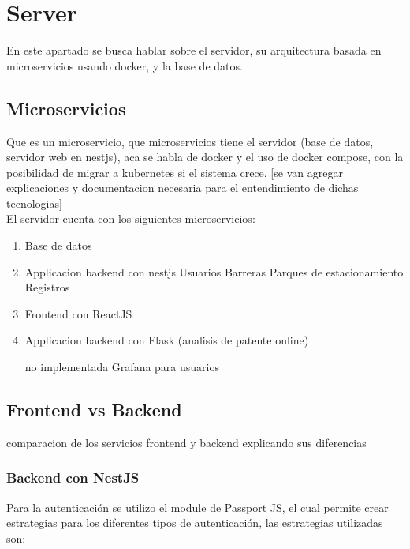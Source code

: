 \section{Server}

En este apartado se busca hablar sobre el servidor, su arquitectura basada en microservicios usando docker, y la base de datos.

\subsection{Microservicios}


Que es un microservicio, que microservicios tiene el servidor (base de datos, servidor web en nestjs), aca se habla de docker y el uso de docker compose, con la posibilidad de migrar a kubernetes si el sistema crece. [se van agregar explicaciones y documentacion necesaria para el
                entendimiento de dichas tecnologias] \\

El servidor cuenta con los siguientes microservicios:

\begin{enumerate}
        \item Base de datos
        \item Applicacion backend con nestjs
              \subitem Usuarios
              \subitem Barreras
              \subitem Parques de estacionamiento
              \subitem Registros
        \item Frontend con ReactJS
        \item Applicacion backend con Flask (analisis de patente online)
        \item [no implementada] Grafana para usuarios
\end{enumerate}

\subsection{Frontend vs Backend}

comparacion de los servicios frontend y backend explicando sus diferencias \\

\subsubsection*{Backend con NestJS}


Para la autenticación se utilizo el module de Passport JS, el cual permite crear estrategias para los diferentes tipos de autenticación, las estrategias utilizadas son:

